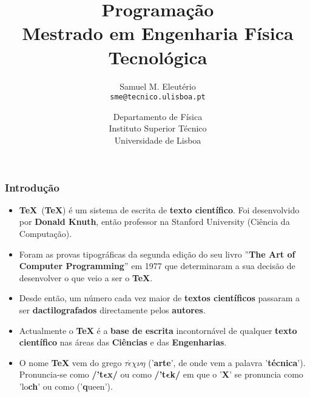 \documentclass[12pt]{beamer}
\title[Programação - 26ª Aula (11.12.2019)]{\bf \Large{Programação} \\ 
\large{Mestrado em Engenharia Física Tecnológica}}
\author[Mestrado em Engenharia Física Tecnológica]{Samuel M. Eleutério \\ 
\texttt{sme@tecnico.ulisboa.pt}}
\date[IST-UTL]{Departamento de Física \\ Instituto Superior Técnico \\ 
Universidade de Lisboa}
\begin{document}
\begin{frame}
\titlepage
\end{frame}

\begin{frame}
\frametitle{{\color{blue}\bf Introdução}}
\begin{itemize}
\item<1->{\color{blue}\bf \TeX}\ ({\color{blue}\bf TeX}) é um sistema de 
escrita de {\color{red}\bf texto científico}. 
Foi desenvolvido por {\color{blue}\bf Donald Knuth}, então professor
na Stanford University (Ciência da Computação).
\item<2->Foram as provas tipográficas da segunda
edição do seu livro ''{\color{blue}\bf The Art of Computer Programming}'' 
em 1977 que determinaram a sua decisão de desenvolver o que veio a
ser o {\color{blue}\bf \TeX}.
\item<3->Desde então, um número cada vez maior de 
{\color{blue}\bf textos científicos} passaram a ser 
{\color{DarkRed}\bf dactilografados} directamente 
pelos {\color{red}\bf autores}.
\item<4->Actualmente o {\color{blue}\bf \TeX} é a {\color{red}\bf base de escrita} 
incontornável de qualquer
{\color{DarkGreen}\bf texto científico} nas áreas das {\color{DarkRed}\bf Ciências} 
e das {\color{DarkRed}\bf Engenharias}.
\item<5->O nome {\color{blue}\bf TeX} vem do grego 
{\color{red}\boldmath $\tau\acute{\epsilon}\chi\nu\eta$}
('{\color{DarkRed}\bf arte}', de onde vem a palavra '{\color{DarkRed}\bf técnica}').
Pronuncia-se como {\color{DarkGreen}\bf /'t${\bm \epsilon}$x/} ou como 
{\color{DarkGreen}\bf /'t{${\bm \epsilon}$}k/} 
em que o '{\color{red}\bf X}' se pronuncia como 
'lo{\color{red}\bf ch}' ou como ('{\color{red}\bf q}ueen').
\end{itemize}
\end{frame}
\end{document}
